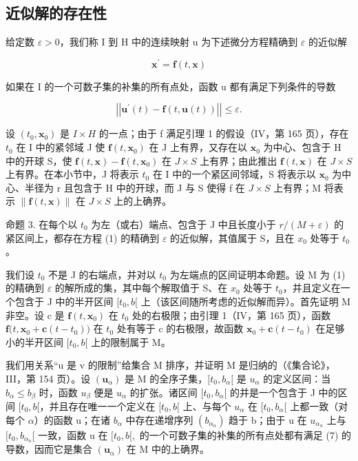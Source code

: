 \subsection{近似解的存在性}

给定数 \(\varepsilon > 0\)，我们称 I 到 H 中的连续映射 u 为下述微分方程精确到 \(\varepsilon\) 的近似解

\[
\mathbf {x} ^ {\prime} = \mathbf {f} (t, \mathbf {x})\tag{1}
\]

如果在 I 的一个可数子集的补集的所有点处，函数 u 都有满足下列条件的导数

\[
\left| \left| \mathbf {u} ^ {\prime} (t) - \mathbf {f} (t, \mathbf {u} (t)) \right| \right| \leqslant \varepsilon .\tag{7}
\]

设 \((t_{0}, \mathbf{x}_{0})\) 是 \(I \times H\) 的一点；由于 f 满足引理 1 的假设（IV，第 165 页），存在 \(t_{0}\) 在 I 中的紧邻域 J 使 \(\mathbf{f}(t, \mathbf{x}_{0})\) 在 J 上有界，又存在以 \(\mathbf{x}_{0}\) 为中心、包含于 H 中的开球 S，使 \(\mathbf{f}(t, \mathbf{x}) - \mathbf{f}(t, \mathbf{x}_{0})\) 在 \(J \times S\) 上有界；由此推出 \(\mathbf{f}(t, \mathbf{x})\) 在 \(J \times S\) 上有界。在本小节中，J 将表示 \(t_{0}\) 在 I 中的一个紧区间邻域，S 将表示以 \(\mathbf{x}_{0}\) 为中心、半径为 r 且包含于 H 中的开球，而 J 与 S 使得 f 在 \(J \times S\) 上有界；M 将表示 \(\| \mathbf{f}(t, \mathbf{x}) \|\) 在 \(J \times S\) 上的上确界。

命题 3. 在每个以 \(t_{0}\) 为左（或右）端点、包含于 J 中且长度小于 \(r/(M + \varepsilon)\) 的紧区间上，都存在方程 (1) 的精确到 \(\varepsilon\) 的近似解，其值属于 S，且在 \(x_{0}\) 处等于 \(t_{0}\)。

我们设 \(t_{0}\) 不是 J 的右端点，并对以 \(t_{0}\) 为左端点的区间证明本命题。设 M 为 (1) 的精确到 \(\varepsilon\) 的解所成的集，其中每个解取值于 S、在 \(x_{0}\) 处等于 \(t_{0}\)，并且定义在一个包含于 J 中的半开区间 \([t_{0}, b[\) 上（该区间随所考虑的近似解而异）。首先证明 M 非空。设 c 是 \(\mathbf{f}(t, \mathbf{x}_{0})\) 在 \(t_{0}\) 处的右极限；由引理 1（IV，第 165 页），函数 \(\mathbf{f}\big(t, \mathbf{x}_{0} + \mathbf{c}(t - t_{0})\big)\) 在 \(t_{0}\) 处有等于 c 的右极限，故函数 \(\mathbf{x}_{0} + \mathbf{c}(t - t_{0})\) 在足够小的半开区间 \([t_{0}, b[\) 上的限制属于 M。

我们用关系“u 是 v 的限制”给集合 M 排序，并证明 M 是归纳的（《集合论》，III，第 154 页）。设 \((\mathbf{u}_{\alpha})\) 是 M 的全序子集，\([t_{0}, b_{\alpha}[\) 是 \(u_{\alpha}\) 的定义区间：当 \(b_{\alpha} \leqslant b_{\beta}\) 时，函数 \(u_{\beta}\) 便是 \(u_{\alpha}\) 的扩张。诸区间 \([t_{0}, b_{\alpha}[\) 的并是一个包含于 J 中的区间 \([t_{0}, b[\)，并且存在唯一一个定义在 \([t_{0}, b[\) 上、与每个 \(u_{\alpha}\) 在 \([t_{0}, b_{\alpha}[\) 上都一致（对每个 \(\alpha\)）的函数 u；在诸 \(b_{\alpha}\) 中存在递增序列 \((b_{\alpha_{n}})\) 趋于 b；由于 u 在 \(u_{\alpha_{n}}\) 上与 \([t_{0}, b_{\alpha_{n}}[\) 一致，函数 u 在 \([t_{0}, b[,\) 的一个可数子集的补集的所有点处都有满足 (7) 的导数，因而它是集合 \((\mathbf{u}_{\alpha})\) 在 M 中的上确界。

